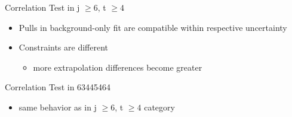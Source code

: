 \begin{frame}{Correlation Test in j $\geq 6$, t $\geq 4$}

\begin{itemize}
\item Pulls in background-only fit are compatible within respective uncertainty\\
\item Constraints are different
\begin{itemize}
\item more extrapolation \rar differences become greater

\end{itemize}
\end{itemize}
\end{frame}

\begin{frame}{Correlation Test in 63445464}

\begin{itemize}
\item same behavior as in j $\geq 6$, t $\geq 4$ category
\end{itemize}
\end{frame}
